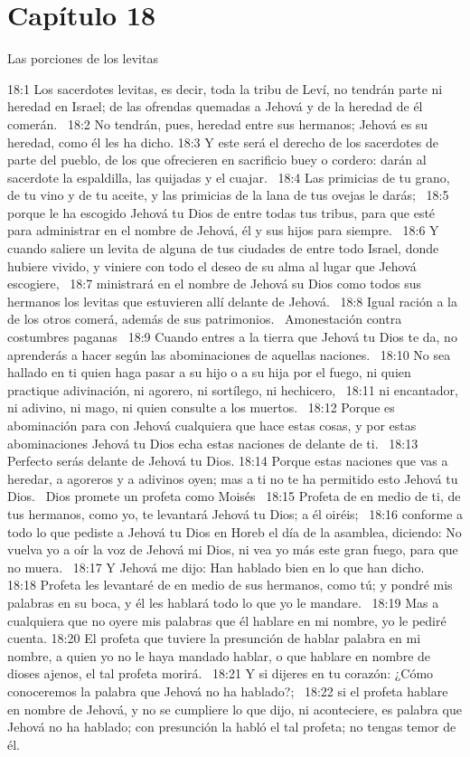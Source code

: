 \section*{Capítulo 18}
Las porciones de los levitas  

18:1 Los sacerdotes levitas, es decir, toda la tribu de Leví, no tendrán parte ni heredad en Israel; de las ofrendas quemadas a Jehová y de la heredad de él comerán.  
18:2 No tendrán, pues, heredad entre sus hermanos; Jehová es su heredad, como él les ha dicho. 
18:3 Y este será el derecho de los sacerdotes de parte del pueblo, de los que ofrecieren en sacrificio buey o cordero: darán al sacerdote la espaldilla, las quijadas y el cuajar.  
18:4 Las primicias de tu grano, de tu vino y de tu aceite, y las primicias de la lana de tus ovejas le darás;  
18:5 porque le ha escogido Jehová tu Dios de entre todas tus tribus, para que esté para administrar en el nombre de Jehová, él y sus hijos para siempre.  
18:6 Y cuando saliere un levita de alguna de tus ciudades de entre todo Israel, donde hubiere vivido, y viniere con todo el deseo de su alma al lugar que Jehová escogiere,  
18:7 ministrará en el nombre de Jehová su Dios como todos sus hermanos los levitas que estuvieren allí delante de Jehová.  
18:8 Igual ración a la de los otros comerá, además de sus patrimonios.  
Amonestación contra costumbres paganas  
18:9 Cuando entres a la tierra que Jehová tu Dios te da, no aprenderás a hacer según las abominaciones de aquellas naciones.  
18:10 No sea hallado en ti quien haga pasar a su hijo o a su hija por el fuego, ni quien practique adivinación, ni agorero, ni sortílego, ni hechicero,  
18:11 ni encantador, ni adivino, ni mago, ni quien consulte a los muertos.  
18:12 Porque es abominación para con Jehová cualquiera que hace estas cosas, y por estas abominaciones Jehová tu Dios echa estas naciones de delante de ti.  
18:13 Perfecto serás delante de Jehová tu Dios. 
18:14 Porque estas naciones que vas a heredar, a agoreros y a adivinos oyen; mas a ti no te ha permitido esto Jehová tu Dios.  
Dios promete un profeta como Moisés  
18:15 Profeta de en medio de ti, de tus hermanos, como yo, te levantará Jehová tu Dios; a él oiréis;  
18:16 conforme a todo lo que pediste a Jehová tu Dios en Horeb el día de la asamblea, diciendo: No vuelva yo a oír la voz de Jehová mi Dios, ni vea yo más este gran fuego, para que no muera.  
18:17 Y Jehová me dijo: Han hablado bien en lo que han dicho.  
18:18 Profeta les levantaré de en medio de sus hermanos, como tú; y pondré mis palabras en su boca, y él les hablará todo lo que yo le mandare.  
18:19 Mas a cualquiera que no oyere mis palabras que él hablare en mi nombre, yo le pediré cuenta. 
18:20 El profeta que tuviere la presunción de hablar palabra en mi nombre, a quien yo no le haya mandado hablar, o que hablare en nombre de dioses ajenos, el tal profeta morirá.  
18:21 Y si dijeres en tu corazón: ¿Cómo conoceremos la palabra que Jehová no ha hablado?;  
18:22 si el profeta hablare en nombre de Jehová, y no se cumpliere lo que dijo, ni aconteciere, es palabra que Jehová no ha hablado; con presunción la habló el tal profeta; no tengas temor de él.  
